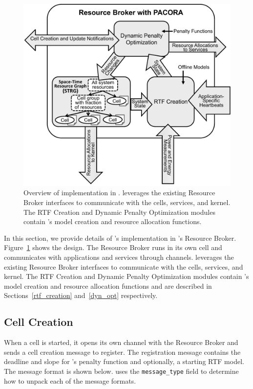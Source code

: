 \begin{figure}[t]
\centering
\includegraphics[width=0.885\linewidth]{Figures/pacora-in-tess}
\caption{
Overview of \pacora implementation in \tess.  \pacora leverages the existing Resource Broker interfaces to communicate with the cells, services, and kernel.  The RTF Creation and Dynamic Penalty Optimization modules contain \pacora's model creation and resource allocation functions.
}
\label{fig:pacora-in-tess}
\end{figure}

In this section, we provide details of \pacora's implementation in \tess's Resource Broker. Figure~\ref{fig:pacora-in-tess} shows the design. The Resource Broker runs in its own cell and communicates with applications and services through channels. \pacora leverages the existing Resource Broker interfaces to communicate with the cells, services, and kernel.  The RTF Creation and Dynamic Penalty Optimization modules contain \pacora's model creation and resource allocation functions and are described in Sections~\ref{rtf_creation} and~\ref{dyn_opt} respectively.

\subsection{Cell Creation}

When a cell is started, it opens its own channel with the Resource Broker and sends a cell creation message to register.
The registration message contains the deadline and slope for \pacora's penalty function and optionally, a starting RTF model.  The message format is shown below.  \pacora uses the \texttt{message\_type} field to determine how to unpack each of the message formats.

